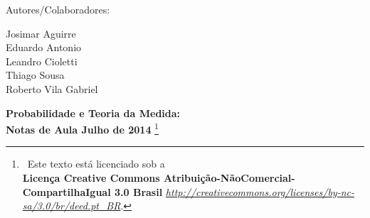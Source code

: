 \documentclass[12pt,oneside]{book}
\begin{document}
\frontmatter 



\noindent
{\huge Autores/Colaboradores:}

\bigskip
\noindent
Josimar Aguirre
\\
Eduardo Antonio
\\
Leandro Cioletti
\\
Thiago Sousa
\\
Roberto Vila Gabriel


\vfill
{\fontsize{14pt}{14pt}\selectfont
	\noindent
   \textbf{Probabilidade e Teoria da Medida:\\ Notas de Aula Julho de 2014}
   \footnote{
   		\ccbyncsa\ Este texto est\'a licenciado sob a
   		\\ 
   		\textbf{Licen\c{c}a Creative Commons Atribui\c{c}\~ao-N\~aoComercial-CompartilhaIgual 3.0 Brasil}
   		\href{http://creativecommons.org/licenses/by-nc-sa/3.0/br/deed.pt\_BR}
   		{\textit{http://creativecommons.org/licenses/by-nc-sa/3.0/br/deed.pt\_BR}}.
   	}
 }






\tableofcontents
{}



\makeatletter

\ChTitleVar{\Huge\bfseries\rm}
\ChRuleWidth{1pt}


\renewcommand{\DOTIS}[1]{%

\settowidth{\px}{\CNV\FmN{Lista de Exerc\'icios}}
    \addtolength{\px}{2pt}
    \settoheight{\py}{\CNV\FmN{Lista de Exerc\'icios}}
    \addtolength{\py}{1pt}

    \settoheight{\pyy}{\CNoV\thechapter}
    \addtolength{\pyy}{-2pt}
    \setlength{\myhi}{\pyy}
    \addtolength{\myhi}{-1\py}
    \par
    \parbox[b]{\textwidth}{%
    \rule[\py]{\RW}{\myhi}%
    \hskip -\RW%
    \rule[\pyy]{\px}{\RW}%
    \hskip -\px%
    \raggedright%
    \CNV\FmN{Lista de Exerc\'icios}\space\CNoV %
    \hskip1pt%
    \mghrulefill{\RW}%
    \rule{\RW}{\pyy}\par\nobreak%
    \vskip -\baselineskip%
    \vskip -\pyy%
    \hskip \mylen%
    \mghrulefill{\RW}\par\nobreak%
    \vskip \pyy}%
    \vskip -2\p@}
\makeatother
%
\end{document}
